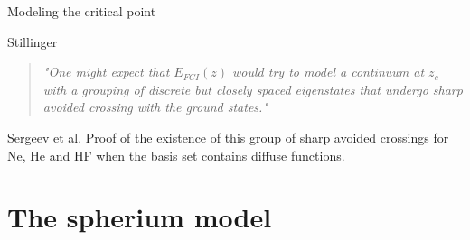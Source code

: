 \documentclass[xcolor=x11names,compress]{beamer}
\renewcommand{\(}{\begin{columns}}
\renewcommand{\)}{\end{columns}}
\newcommand{\<}[1]{\begin{column}{#1}}
\renewcommand{\>}{\end{column}}
\begin{document}
\begin{frame}{Modeling the critical point}

\pause[1]

\begin{beamerboxesrounded}[scheme=foncé]{\centering Stillinger}
\begin{quote}
    \textit{"One might expect that $E_{FCI}(z) $ would try to model a continuum at $z_c$ with a grouping of discrete but closely spaced eigenstates that undergo sharp avoided crossing with the ground states."}
\end{quote}
\end{beamerboxesrounded}

\vspace{0.5cm}

\pause[2]

\begin{beamerboxesrounded}[scheme=foncé]{\centering Sergeev et al.}
Proof of the existence of this group of sharp avoided crossings for Ne, He and HF when the basis set contains diffuse functions.
\end{beamerboxesrounded}
    
\end{frame}

\section{The spherium model}
\end{document}

